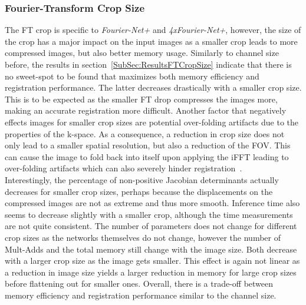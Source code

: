 \subsubsection{Fourier-Transform Crop Size} \label{SubSubSec:DiscussionFTCropSize}
The FT crop is specific to \emph{Fourier-Net+} and \emph{4xFourier-Net+}, however, the size of the crop has a major impact on the input images as a smaller crop leads to more compressed images, but also better memory usage. Similarly to channel size before, the results in section~\ref{SubSec:ResultsFTCropSize} indicate that there is no sweet-spot to be found that maximizes both memory efficiency and registration performance. The latter decreases drastically with a smaller crop size. This is to be expected as the smaller FT drop compresses the images more, making an accurate registration more difficult. Another factor that negatively effects images for smaller crop sizes are potential over-folding artifacts due to the properties of the k-space. As a consequence, a reduction in crop size does not only lead to a smaller spatial resolution, but also a reduction of the FOV. This can cause the image to fold back into itself upon applying the iFFT leading to over-folding artifacts which can also severely hinder registration~\cite{SamplingStrategies}. \\
Interestingly, the percentage of non-positive Jacobian determinants actually decreases for smaller crop sizes, perhaps because the displacements on the compressed images are not as extreme and thus more smooth. Inference time also seems to decrease slightly with a smaller crop, although the time measurements are not quite consistent. The number of parameters does not change for different crop sizes as the networks themselves do not change, however the number of Mult-Adds and the total memory still change with the image size. Both decrease with a larger crop size as the image gets smaller. This effect is again not linear as a reduction in image size yields a larger reduction in memory for large crop sizes before flattening out for smaller ones. Overall, there is a trade-off between memory efficiency and registration performance similar to the channel size.

